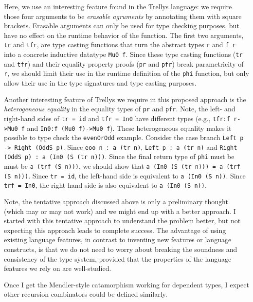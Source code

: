 \documentclass[letterpaper,12pt]{article}
\begin{document}
Here, we use an interesting feature found in the Trellys language:
we require those four arguments to be \emph{erasable agruments}
by annotating them with square brackets. Erasable arguments can only be
used for type checking purposes, but have no effect on the runtime behavior
of the function.  The first two arguments,
\verb|tr| and \verb|tfr|, are type casting functions that turn the abstract
types \verb|r| and \verb|f r| into a concrete inductive datatype \verb|Mu0 f|.
Since these type casting functions (\verb|tr| and \verb|tfr|) and
their equality property proofs (\verb|pr| and \verb|pfr|) break parametricity
of \verb|r|, we should limit their use in the runtime definition of
the \verb|phi| function, but only allow their use in the type signatures
and type casting purposes.

Another interesting feature of Trellys we require in this proposed approach
is the \emph{heterogeneous equality} in the equality types of \verb|pr| and
\verb|pfr|.
Note, the left- and right-hand sides of \verb|tr = id| and \verb|tfr = In0|
have different types (e.g., \texttt{tfr:f r->Mu0 f} and
\texttt{In0:f (Mu0 f)->Mu0 f}). 
These heterogeneous equality makes it possible to type check the
\verb|evenOrOdd| example.  Consider the case branch
\verb|Left p -> Right (OddS p)|.  Since \verb|eoo n : a (tr n)|,
\texttt{Left p : a (tr n)} and \verb|Right (OddS p) : a (In0 (S (tr n)))|.
Since the final return type of \verb|phi| must be must be \verb|a (trf (S n)))|,
we should show that \texttt{a (In0 (S (tr n))) = a (trf (S n)))}.
Since \verb|tr = id|, the left-hand side is equivalent to \verb|a (In0 (S n))|.
Since \verb|trf = In0|, the right-hand side is also equivalent to
\verb|a (In0 (S n))|.


Note, the tentative approach discussed above is only a preliminary thought
(which may or may not work) and we might end up with a better approach.
I started with this tentative approach to understand the problem better,
but not expecting this approach leads to complete success. The advantage
of using existing language features, in contrast to inventing new features
or language constructs, is that we do not need to worry about breaking the
soundness and consistency of the type system, provided that the properties
of the language features we rely on are well-studied.

Once I get the Mendler-style catamorphism working for dependent types,
I expect other recursion combinators could be defined similarly.
\end{document}
